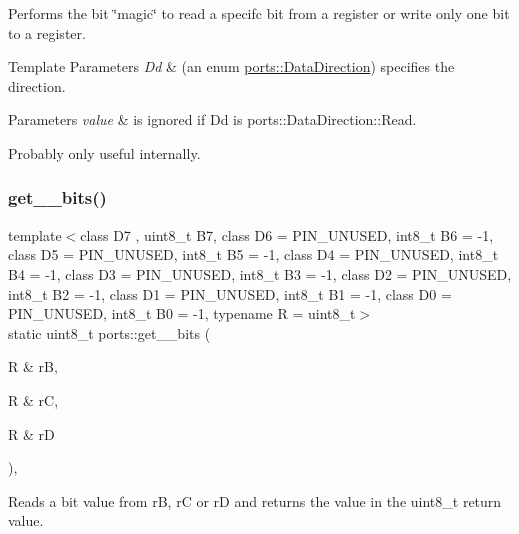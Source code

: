 Performs the bit \char`\"{}magic\char`\"{} to read a specifc bit from a register or write only one bit to a register. 


\begin{DoxyTemplParams}{Template Parameters}
{\em Dd} & (an enum \hyperlink{namespaceports_a46987e78fa447129742fadda5eccafb4}{ports\+::\+Data\+Direction}) specifies the direction. \\
\hline
\end{DoxyTemplParams}

\begin{DoxyParams}{Parameters}
{\em value} & is ignored if Dd is ports\+::\+Data\+Direction\+::\+Read.\\
\hline
\end{DoxyParams}
Probably only useful internally. \hypertarget{namespaceports_a9a1959ec95780c00a964b174a27b2a37}{}\label{namespaceports_a9a1959ec95780c00a964b174a27b2a37} 
\subsubsection{\texorpdfstring{get\+\_\+\_\+bits()}{get\_8\_bits()}\hspace{0.1cm}{\footnotesize\ttfamily [1/2]}}
{\footnotesize\ttfamily template$<$class D7 , uint8\+\_\+t B7, class D6  = P\+I\+N\+\_\+\+U\+N\+U\+S\+ED, int8\+\_\+t B6 = -\/1, class D5  = P\+I\+N\+\_\+\+U\+N\+U\+S\+ED, int8\+\_\+t B5 = -\/1, class D4  = P\+I\+N\+\_\+\+U\+N\+U\+S\+ED, int8\+\_\+t B4 = -\/1, class D3  = P\+I\+N\+\_\+\+U\+N\+U\+S\+ED, int8\+\_\+t B3 = -\/1, class D2  = P\+I\+N\+\_\+\+U\+N\+U\+S\+ED, int8\+\_\+t B2 = -\/1, class D1  = P\+I\+N\+\_\+\+U\+N\+U\+S\+ED, int8\+\_\+t B1 = -\/1, class D0  = P\+I\+N\+\_\+\+U\+N\+U\+S\+ED, int8\+\_\+t B0 = -\/1, typename R  = uint8\+\_\+t$>$ \\
static uint8\+\_\+t ports\+::get\+\_\+\_\+bits (\begin{DoxyParamCaption}\item[{R \&}]{rB,  }\item[{R \&}]{rC,  }\item[{R \&}]{rD }\end{DoxyParamCaption})\hspace{0.3cm}{\ttfamily [inline]}, {\ttfamily [static]}}



Reads a bit value from {\ttfamily rB}, {\ttfamily rC} or {\ttfamily rD} and returns the value in the {\ttfamily uint8\+\_\+t} return value. 

